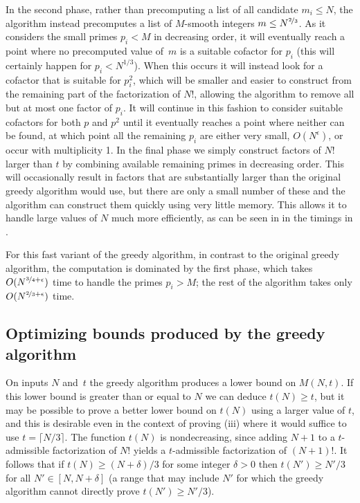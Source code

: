 \documentclass[12pt,a4paper,reqno]{amsart}
\numberwithin{equation}{section}
\theoremstyle{plain}
\theoremstyle{definition}
\begin{document}
In the second phase, rather than precomputing a list of all candidate $m_i\le N$, the algorithm instead precomputes a list of $M$-smooth integers $m\le N^{\nicefrac{2}{3}}$.  As it considers the small primes $p_i < M$ in decreasing order, it will eventually reach a point where no precomputed value of~$m$ is a suitable cofactor for $p_i$ (this will certainly happen for $p_i < N^{1/3}$).  When this occurs it will instead look for a cofactor that is suitable for $p_i^2$, which will be smaller and easier to construct from the remaining part of the factorization of $N!$, allowing the algorithm to remove all but at most one factor of $p_i$.  It will continue in this fashion to consider suitable cofactors for both $p$ and $p^2$ until it eventually reaches a point where neither can be found, at which point all the remaining $p_i$ are either very small, $O(N^\epsilon)$, or occur with multiplicity 1.  In the final phase we simply construct factors of $N!$ larger than $t$ by combining available remaining primes in decreasing order.  This will occasionally result in factors that are substantially larger than the original greedy algorithm would use, but there are only a small number of these and the algorithm can construct them quickly using very little memory.  This allows it to handle large values of $N$ much more efficiently, as can be seen in in the timings in .

For this fast variant of the greedy algorithm, in contrast to the original greedy algorithm, the computation is dominated by the first phase, which takes $O(N^{\nicefrac{3}{4}+\epsilon})$ time to handle the primes $p_i>M$; the rest of the algorithm takes only $O(N^{\nicefrac{2}{3}+\epsilon})$ time.

\subsection{Optimizing bounds produced by the greedy algorithm}
On inputs $N$ and~$t$ the greedy algorithm produces a lower bound on $M(N,t)$. If this lower bound is greater than or equal to $N$ we can deduce $t(N)\ge t$, but it may be possible to prove a better lower bound on $t(N)$ using a larger value of $t$, and this is desirable even in the context of proving (iii) where it would suffice to use $t=\lceil N/3\rceil$.  The function $t(N)$ is nondecreasing, since adding $N+1$ to a $t$-admissible factorization of $N!$ yields a $t$-admissible factorization of $(N+1)!$. It follows that if $t(N) \ge (N+\delta)/3$ for some integer $\delta >0$ then $t(N')\ge N'/3$ for all $N'\in [N,N+\delta]$ (a range that may include $N'$ for which the greedy algorithm cannot directly prove $t(N')\ge N'/3$).
\end{document}
